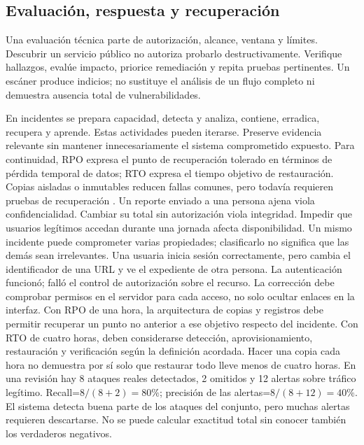 \subsection{Evaluación, respuesta y recuperación}
Una evaluación técnica parte de autorización, alcance, ventana y límites. Descubrir un servicio público no autoriza probarlo destructivamente. Verifique hallazgos, evalúe impacto, priorice remediación y repita pruebas pertinentes. Un escáner produce indicios; no sustituye el análisis de un flujo completo ni demuestra ausencia total de vulnerabilidades.

En incidentes se prepara capacidad, detecta y analiza, contiene, erradica, recupera y aprende. Estas actividades pueden iterarse. Preserve evidencia relevante sin mantener innecesariamente el sistema comprometido expuesto. Para continuidad, RPO expresa el punto de recuperación tolerado en términos de pérdida temporal de datos; RTO expresa el tiempo objetivo de restauración. Copias aisladas o inmutables reducen fallas comunes, pero todavía requieren pruebas de recuperación \cite[familias IR y CP]{nistsecurity}.
Un reporte enviado a una persona ajena viola confidencialidad. Cambiar su total sin autorización viola integridad. Impedir que usuarios legítimos accedan durante una jornada afecta disponibilidad. Un mismo incidente puede comprometer varias propiedades; clasificarlo no significa que las demás sean irrelevantes.
Una usuaria inicia sesión correctamente, pero cambia el identificador de una URL y ve el expediente de otra persona. La autenticación funcionó; falló el control de autorización sobre el recurso. La corrección debe comprobar permisos en el servidor para cada acceso, no solo ocultar enlaces en la interfaz.
Con RPO de una hora, la arquitectura de copias y registros debe permitir recuperar un punto no anterior a ese objetivo respecto del incidente. Con RTO de cuatro horas, deben considerarse detección, aprovisionamiento, restauración y verificación según la definición acordada. Hacer una copia cada hora no demuestra por sí solo que restaurar todo lleve menos de cuatro horas.
En una revisión hay 8 ataques reales detectados, 2 omitidos y 12 alertas sobre tráfico legítimo. Recall=$8/(8+2)=80\%$; precisión de las alertas=$8/(8+12)=40\%$. El sistema detecta buena parte de los ataques del conjunto, pero muchas alertas requieren descartarse. No se puede calcular exactitud total sin conocer también los verdaderos negativos.

